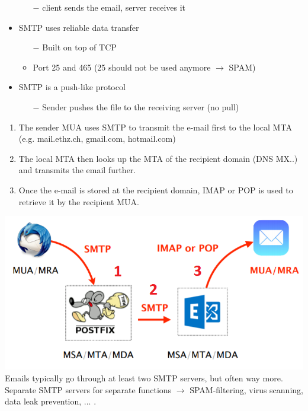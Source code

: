 \documentclass[a4paper, fontsize=8pt, landscape, DIV=1]{scrartcl}
\begin{document}
\begin{multicols*}{4}
\begin{itemize}[noitemsep]
			\begin{itemize}
				\item[$-$] client sends the email, server receives it
			\end{itemize}
			\item SMTP uses reliable data transfer
			\begin{itemize}
				\item[$-$] Built on top of TCP 
				\item Port 25 and 465 (25 should not be used anymore $\rightarrow$ SPAM)
			\end{itemize}
			\item SMTP is a push-like protocol 
			\begin{itemize}
				\item[$-$] Sender pushes the file to the receiving server (no pull)
			\end{itemize}
		\end{itemize} 
		\begin{enumerate}
			\item The sender MUA uses SMTP to transmit the e-mail first to the local MTA (e.g. mail.ethz.ch, gmail.com, hotmail.com)
			\item The local MTA then looks up the MTA of the recipient domain (DNS MX..) and transmits the email further.
			\item Once the e-mail is stored at the recipient domain, IMAP or POP is used to retrieve it by the recipient MUA. 
		\end{enumerate}
		\includegraphics[width=\columnwidth]{images/Application_Layer/email_way.png}
		Emails typically go through at least two SMTP servers, but often way more. Separate SMTP servers for separate functions $\rightarrow$ SPAM-filtering, virus scanning, data leak prevention, ... .\\
		

\end{multicols*}
\end{document}
